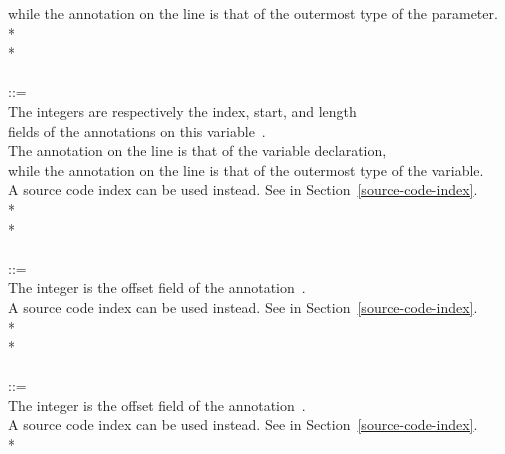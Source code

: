 \documentclass{article}
\begin{document}
\begin{tabbing}
\qquad    \bnfcmt while the annotation on the  line is that of the outermost type of the parameter. \\
\qquad    {}  \bnflit{:} * \lineend \\
\qquad    {}* \\
\\
 ::= \\
\qquad    \bnfcmt The integers are respectively the index, start, and length \\
\qquad    \bnfcmt fields of the annotations on this variable~\cite{JSR308}. \\
\qquad    \bnfcmt The annotation on the  line is that of the variable declaration, \\
\qquad    \bnfcmt while the annotation on the  line is that of the outermost type of the variable. \\
\qquad    \bnfcmt A source code index can be used instead. See  in Section~\ref{source-code-index}. \\
\qquad    {}  \bnflit{\#}  \bnflit{+}  \bnflit{:} * \lineend \\
\qquad    {}* \\
\\
 ::= \\
\qquad    \bnfcmt The integer is the offset field of the annotation~\cite{JSR308}. \\
\qquad    \bnfcmt A source code index can be used instead. See  in Section~\ref{source-code-index}. \\
\qquad    {} \bnflit{\#}  \bnflit{:} * \lineend \\
\qquad    {}* \\
\\
 ::= \\
\qquad    \bnfcmt The integer is the offset field of the annotation~\cite{JSR308}. \\
\qquad    \bnfcmt A source code index can be used instead. See  in Section~\ref{source-code-index}. \\
\qquad    {} \bnflit{\#}  \bnflit{:} * \lineend \\

\end{tabbing}
\end{document}
